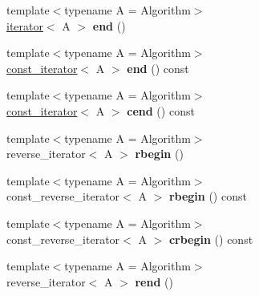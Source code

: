 \begin{DoxyCompactItemize}
\item 
{\footnotesize template$<$typename A  = Algorithm$>$ }\\\hyperlink{classds_1_1tree__iterator}{iterator}$<$ A $>$ {\bfseries end} ()\hypertarget{classds_1_1tree_aa4467f7fcb6ad85a4eb2001cc26835bd}{}\label{classds_1_1tree_aa4467f7fcb6ad85a4eb2001cc26835bd}

\item 
{\footnotesize template$<$typename A  = Algorithm$>$ }\\\hyperlink{classds_1_1tree__iterator}{const\+\_\+iterator}$<$ A $>$ {\bfseries end} () const \hypertarget{classds_1_1tree_a477df6d607ba16afa41737b79d026155}{}\label{classds_1_1tree_a477df6d607ba16afa41737b79d026155}

\item 
{\footnotesize template$<$typename A  = Algorithm$>$ }\\\hyperlink{classds_1_1tree__iterator}{const\+\_\+iterator}$<$ A $>$ {\bfseries cend} () const \hypertarget{classds_1_1tree_a0fc3b520dd604f8695754153a2f9173d}{}\label{classds_1_1tree_a0fc3b520dd604f8695754153a2f9173d}

\item 
{\footnotesize template$<$typename A  = Algorithm$>$ }\\reverse\+\_\+iterator$<$ A $>$ {\bfseries rbegin} ()\hypertarget{classds_1_1tree_a62bd9bf9f78552b5789f52b09964fd4b}{}\label{classds_1_1tree_a62bd9bf9f78552b5789f52b09964fd4b}

\item 
{\footnotesize template$<$typename A  = Algorithm$>$ }\\const\+\_\+reverse\+\_\+iterator$<$ A $>$ {\bfseries rbegin} () const \hypertarget{classds_1_1tree_a7b1d46a39e00c9743073dfafee9a5ffd}{}\label{classds_1_1tree_a7b1d46a39e00c9743073dfafee9a5ffd}

\item 
{\footnotesize template$<$typename A  = Algorithm$>$ }\\const\+\_\+reverse\+\_\+iterator$<$ A $>$ {\bfseries crbegin} () const \hypertarget{classds_1_1tree_a532ea2fdf3dc2362ab21b4e1ce4801b4}{}\label{classds_1_1tree_a532ea2fdf3dc2362ab21b4e1ce4801b4}

\item 
{\footnotesize template$<$typename A  = Algorithm$>$ }\\reverse\+\_\+iterator$<$ A $>$ {\bfseries rend} ()\hypertarget{classds_1_1tree_a8fea8fb2a0ddc8420953e1414c3bd388}{}\label{classds_1_1tree_a8fea8fb2a0ddc8420953e1414c3bd388}


\end{DoxyCompactItemize}
